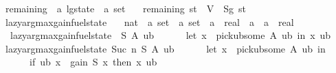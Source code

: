 \begin{isabellebody}
\isanewline
{}\isamarkupfalse%
\ remaining\ {\isacharcolon}{\kern0pt}{\isacharcolon}{\kern0pt}\ {\isachardoublequoteopen}{\isacharprime}{\kern0pt}a\ lg{\isacharunderscore}{\kern0pt}state\ {\isasymRightarrow}\ {\isacharprime}{\kern0pt}a\ set{\isachardoublequoteclose}\ \isanewline
\ \ {\isachardoublequoteopen}remaining\ st\ {\isacharequal}{\kern0pt}\ V\ {\isacharminus}{\kern0pt}\ Sg\ st{\isachardoublequoteclose}%
\isadelimdocument
%
\endisadelimdocument
%
\isatagdocument
%
\isamarkuptrue%
%
\endisatagdocument
{\isafolddocument}%
%
\isadelimdocument
%
\endisadelimdocument
{}\isamarkupfalse%
\ lazy{\isacharunderscore}{\kern0pt}argmax{\isacharunderscore}{\kern0pt}gain{\isacharunderscore}{\kern0pt}fuel{\isacharunderscore}{\kern0pt}state\ {\isacharcolon}{\kern0pt}{\isacharcolon}{\kern0pt}\isanewline
\ \ {\isachardoublequoteopen}nat\ {\isasymRightarrow}\ {\isacharprime}{\kern0pt}a\ set\ {\isasymRightarrow}\ {\isacharprime}{\kern0pt}a\ set\ {\isasymRightarrow}\ {\isacharparenleft}{\kern0pt}{\isacharprime}{\kern0pt}a\ {\isasymRightarrow}\ real{\isacharparenright}{\kern0pt}\ {\isasymRightarrow}\ {\isacharparenleft}{\kern0pt}{\isacharprime}{\kern0pt}a\ {\isasymtimes}\ {\isacharparenleft}{\kern0pt}{\isacharprime}{\kern0pt}a\ {\isasymRightarrow}\ real{\isacharparenright}{\kern0pt}{\isacharparenright}{\kern0pt}{\isachardoublequoteclose}\isanewline
{}\isanewline
\ \ {\isachardoublequoteopen}lazy{\isacharunderscore}{\kern0pt}argmax{\isacharunderscore}{\kern0pt}gain{\isacharunderscore}{\kern0pt}fuel{\isacharunderscore}{\kern0pt}state\ {}\ S\ A\ ub\ {\isacharequal}{\kern0pt}\isanewline
\ \ \ \ \ {\isacharparenleft}{\kern0pt}let\ x\ {\isacharequal}{\kern0pt}\ pick{\isacharunderscore}{\kern0pt}ub{\isacharunderscore}{\kern0pt}some\ A\ ub\ in\ {\isacharparenleft}{\kern0pt}x{\isacharcomma}{\kern0pt}\ ub{\isacharparenright}{\kern0pt}{\isacharparenright}{\kern0pt}{\isachardoublequoteclose}\isanewline
{\isacharbar}{\kern0pt}\ {\isachardoublequoteopen}lazy{\isacharunderscore}{\kern0pt}argmax{\isacharunderscore}{\kern0pt}gain{\isacharunderscore}{\kern0pt}fuel{\isacharunderscore}{\kern0pt}state\ {\isacharparenleft}{\kern0pt}Suc\ n{\isacharparenright}{\kern0pt}\ S\ A\ ub\ {\isacharequal}{\kern0pt}\isanewline
\ \ \ \ \ {\isacharparenleft}{\kern0pt}let\ x\ {\isacharequal}{\kern0pt}\ pick{\isacharunderscore}{\kern0pt}ub{\isacharunderscore}{\kern0pt}some\ A\ ub\ in\isanewline
\ \ \ \ \ \ if\ ub\ x\ {\isacharequal}{\kern0pt}\ gain\ S\ x\ then\ {\isacharparenleft}{\kern0pt}x{\isacharcomma}{\kern0pt}\ ub{\isacharparenright}{\kern0pt}\isanewline

\end{isabellebody}
